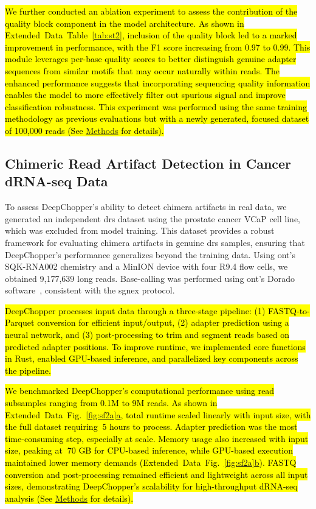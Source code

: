 \documentclass[pdflatex,sn-nature, lineno]{sn-jnl}%
\newcommand{\edfigref}[2]{Extended Data Fig.~\hyperref[#1]{\ref*{#1}#2}}
\newcommand{\edtableref}[2]{Extended Data Table~\hyperref[#1]{\ref*{#1}#2}}
\begin{document}
\hl{We further conducted an ablation experiment to assess the contribution of the quality block component in the model architecture.
As shown in \mbox{\edtableref{tab:st2}{}}, inclusion of the quality block led to a marked improvement in performance, with the F1 score increasing from 0.97 to 0.99.
This module leverages per-base quality scores to better distinguish genuine adapter sequences from similar motifs that may occur naturally within reads.
The enhanced performance suggests that incorporating sequencing quality information enables the model to more effectively filter out spurious signal and improve classification robustness.
This experiment was performed using the same training methodology as previous evaluations but with a newly generated, focused dataset of 100,000 reads (See \mbox{\hyperref[sec:methods]{Methods}} for details).}

\subsection{Chimeric Read Artifact Detection in Cancer dRNA-seq Data}

To assess DeepChopper’s ability to detect chimera artifacts in real data, we generated an independent \gls{drs} dataset using the prostate cancer VCaP cell line, which was excluded from model training.
This dataset provides a robust framework for evaluating chimera artifacts in genuine \gls{drs} samples, ensuring that DeepChopper's performance generalizes beyond the training data. Using \gls{ont}’s SQK-RNA002 chemistry and a MinION device with four R9.4 flow cells, we obtained 9,177,639 long reads. Base-calling was performed using \gls{ont}'s Dorado software~\cite{dorado2023}, consistent with the \gls{sgnex} protocol.

\hl{DeepChopper processes input data through a three-stage pipeline: (1) FASTQ-to-Parquet conversion for efficient input/output, (2) adapter prediction using a neural network, and (3) post-processing to trim and segment reads based on predicted adapter positions. To improve runtime, we implemented core functions in Rust, enabled GPU-based inference, and parallelized key components across the pipeline.}

\hl{We benchmarked DeepChopper’s computational performance using read subsamples ranging from 0.1M to 9M reads. As shown in \mbox{\edfigref{fig:sf2a}{a}}, total runtime scaled linearly with input size, with the full dataset requiring $~5$ hours to process. Adapter prediction was the most time-consuming step, especially at scale. Memory usage also increased with input size, peaking at $~70$ GB for CPU-based inference, while GPU-based execution maintained lower memory demands (\mbox{\edfigref{fig:sf2a}{b}}). FASTQ conversion and post-processing remained efficient and lightweight across all input sizes, demonstrating DeepChopper's scalability for high-throughput dRNA-seq analysis (See \mbox{\hyperref[sec:methods]{Methods}} for details).}
\end{document}
